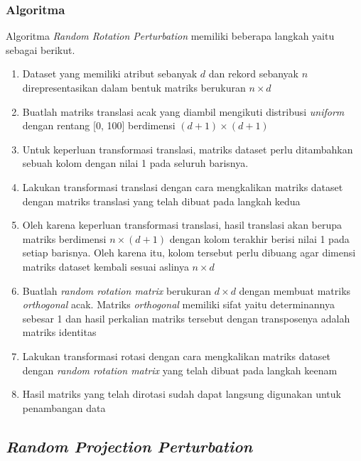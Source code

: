\subsubsection{Algoritma}
\label{subsubsec:algo-rotation}

Algoritma \textit{Random Rotation Perturbation} memiliki beberapa langkah yaitu sebagai berikut.
\begin{enumerate}
    \item Dataset yang memiliki atribut sebanyak \(d\) dan rekord sebanyak \(n\) direpresentasikan dalam bentuk matriks berukuran \(n \times d\)
    \item Buatlah matriks translasi acak yang diambil mengikuti distribusi \textit{uniform} dengan rentang [0, 100] berdimensi \((d+1)\times(d+1)\)
    \item Untuk keperluan transformasi translasi, matriks dataset perlu ditambahkan sebuah kolom dengan nilai 1 pada seluruh barisnya.
    \item Lakukan transformasi translasi dengan cara mengkalikan matriks dataset dengan matriks translasi yang telah dibuat pada langkah kedua
    \item Oleh karena keperluan transformasi translasi, hasil translasi akan berupa matriks berdimensi \(n\times(d+1)\) dengan kolom terakhir berisi nilai 1 pada setiap barisnya. Oleh karena itu, kolom tersebut perlu dibuang agar dimensi matriks dataset kembali sesuai aslinya \(n \times d\)
    \item Buatlah \textit{random rotation matrix} berukuran \(d \times d\) dengan membuat matriks \textit{orthogonal} acak. Matriks \textit{orthogonal} memiliki sifat yaitu determinannya sebesar 1 dan hasil perkalian matriks tersebut dengan transposenya adalah matriks identitas
    \item Lakukan transformasi rotasi dengan cara mengkalikan matriks dataset dengan \textit{random rotation matrix} yang telah dibuat pada langkah keenam
    \item Hasil matriks yang telah dirotasi sudah dapat langsung digunakan untuk penambangan data
\end{enumerate}

\subsection{\textit{Random Projection Perturbation}}
\label{subsec:rpp}

